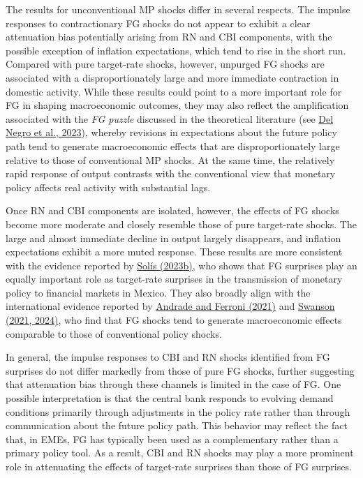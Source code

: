 \documentclass[\latexroot/\projectname]{subfiles}
\begin{document}
The results for unconventional MP shocks differ in several respects. The impulse responses to contractionary FG shocks do not appear to exhibit a clear attenuation bias potentially arising from RN and CBI components, with the possible exception of inflation expectations, which tend to rise in the short run. Compared with pure target-rate shocks, however, unpurged FG shocks are associated with a disproportionately large and more immediate contraction in domestic activity. While these results could point to a more important role for FG in shaping macroeconomic outcomes, they may also reflect the amplification associated with the \emph{FG puzzle} discussed in the theoretical literature (see \hyperlink{Del Negro et al. (2023)}{Del Negro et al., 2023}), whereby revisions in expectations about the future policy path tend to generate macroeconomic effects that are disproportionately large relative to those of conventional MP shocks. At the same time, the relatively rapid response of output contrasts with the conventional view that monetary policy affects real activity with substantial lags.


Once RN and CBI components are isolated, however, the effects of FG shocks become more moderate and closely resemble those of pure target-rate shocks. The large and almost immediate decline in output largely disappears, and inflation expectations exhibit a more muted response. These results are more consistent with the evidence reported by \hyperlink{Solis (2023b)}{Solís (2023b)}, who shows that FG surprises play an equally important role as target-rate surprises in the transmission of monetary policy to financial markets in Mexico. They also broadly align with the international evidence reported by \hyperlink{Andrade and Ferroni (2021)}{Andrade and Ferroni (2021)} and \hyperlink{Swanson (2021, 2024)}{Swanson (2021, 2024)}, who find that FG shocks tend to generate macroeconomic effects comparable to those of conventional policy shocks.

In general, the impulse responses to CBI and RN shocks identified from FG surprises do not differ markedly from those of pure FG shocks, further suggesting that attenuation bias through these channels  is limited in the case of FG. One possible interpretation is that the central bank responds to evolving demand conditions primarily through adjustments in the policy rate rather than through communication about the future policy path. This behavior may reflect the fact that, in EMEs, FG has typically been used as a complementary rather than a primary policy tool. As a result, CBI and RN shocks may play a more prominent role in attenuating the effects of target-rate surprises than those of FG surprises.
\end{document}
